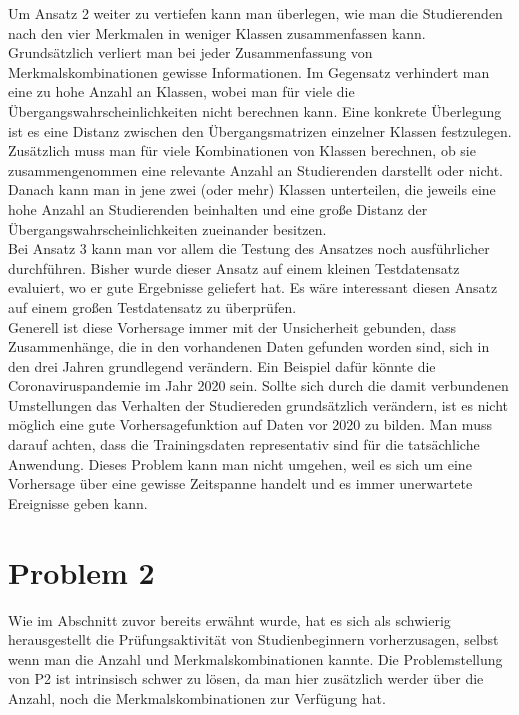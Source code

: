Um Ansatz 2 weiter zu vertiefen kann man \"uberlegen, wie man die Studierenden nach den vier Merkmalen in weniger Klassen zusammenfassen kann. Grunds\"atzlich verliert man bei 
jeder Zusammenfassung von Merkmalskombinationen gewisse Informationen. Im Gegensatz verhindert man eine zu hohe Anzahl an Klassen, wobei man f\"ur viele die \"Ubergangswahrscheinlichkeiten 
nicht berechnen kann. Eine konkrete \"Uberlegung ist es eine Distanz zwischen den \"Ubergangsmatrizen einzelner Klassen festzulegen. Zus\"atzlich muss man f\"ur viele 
Kombinationen von Klassen berechnen, ob sie zusammengenommen eine relevante Anzahl an Studierenden darstellt oder nicht. Danach kann man in jene zwei (oder mehr) Klassen 
unterteilen, die jeweils eine hohe Anzahl an Studierenden beinhalten und eine gro{\ss}e Distanz der \"Ubergangswahrscheinlichkeiten zueinander besitzen. \\

Bei Ansatz 3 kann man vor allem die Testung des Ansatzes noch ausf\"uhrlicher durchf\"uhren. Bisher wurde dieser Ansatz auf einem kleinen Testdatensatz evaluiert, wo er 
gute Ergebnisse geliefert hat. Es w\"are interessant diesen Ansatz auf einem gro{\ss}en Testdatensatz zu \"uberpr\"ufen. \\

Generell ist diese Vorhersage immer mit der Unsicherheit gebunden, dass Zusammenh\"ange, die in den vorhandenen Daten 
gefunden worden sind, sich in den drei Jahren grundlegend ver\"andern. Ein Beispiel daf\"ur k\"onnte die Coronaviruspandemie im Jahr 2020 sein. Sollte sich 
durch die damit verbundenen Umstellungen das Verhalten der Studiereden grunds\"atzlich ver\"andern, ist es nicht m\"oglich eine gute Vorhersagefunktion auf Daten 
vor 2020 zu bilden. Man muss darauf achten, dass die Trainingsdaten representativ sind f\"ur die tats\"achliche Anwendung. Dieses Problem kann man nicht umgehen, 
weil es sich um eine Vorhersage \"uber eine gewisse Zeitspanne handelt und es immer unerwartete Ereignisse geben kann.






\section{Problem 2}

Wie im Abschnitt zuvor bereits erw\"ahnt wurde, hat es sich als schwierig herausgestellt die Pr\"ufungsaktivit\"at von Studienbeginnern vorherzusagen, selbst 
wenn man die Anzahl und Merkmalskombinationen kannte. Die Problemstellung von P2 ist intrinsisch schwer zu l\"osen, da man hier zus\"atzlich werder \"uber die Anzahl, noch die 
Merkmalskombinationen zur Verf\"ugung hat. \\

